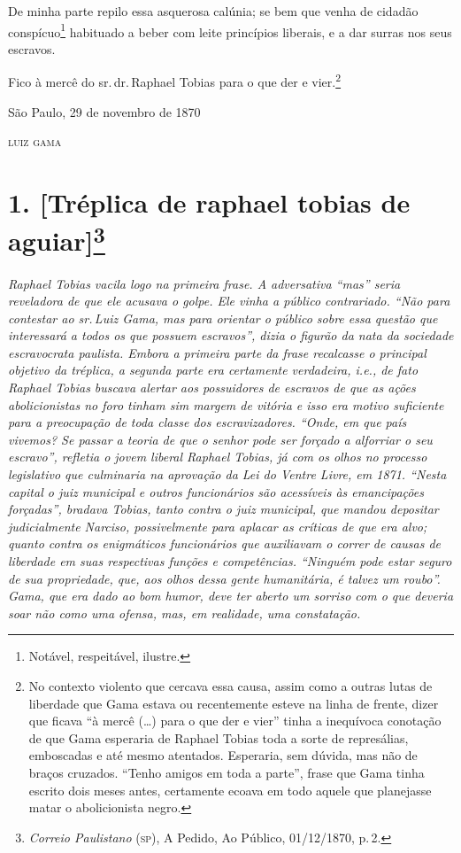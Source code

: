 De minha parte repilo essa asquerosa calúnia; se bem que venha de
cidadão conspícuo\footnote{ Notável, respeitável, ilustre.}
habituado a beber com leite princípios liberais, e a dar surras nos seus
escravos.

Fico à mercê do sr.\,dr.\,Raphael Tobias para o que der e vier.\footnote{
  No contexto violento que cercava essa causa, assim como a outras lutas
  de liberdade que Gama estava ou recentemente esteve na linha de
  frente, dizer que ficava ``à mercê (\ldots) para o que der e vier''
  tinha a inequívoca conotação de que Gama esperaria de Raphael Tobias
  toda a sorte de represálias, emboscadas e até mesmo atentados.
  Esperaria, sem dúvida, mas não de braços cruzados. ``Tenho amigos em
  toda a parte'', frase que Gama tinha escrito dois meses antes,
  certamente ecoava em todo aquele que planejasse matar o abolicionista
  negro.}

\begin{flushright}
São Paulo, 29 de novembro de 1870

\textsc{luiz gama}
\end{flushright}

\chapter{1. {[}Tréplica de raphael tobias de aguiar{]}\footnote{\emph{Correio Paulistano} (\textsc{sp}), A Pedido, Ao Público,
  01/12/1870, p.\,2.}} %

\begin{didascalia}
\emph{Raphael Tobias vacila logo na primeira frase. A adversativa ``mas''
seria reveladora de que ele acusava o golpe. Ele vinha a público
contrariado. ``Não para contestar ao sr.\,Luiz Gama, mas para orientar o
público sobre essa questão que interessará a todos os que possuem
escravos'', dizia o figurão da nata da sociedade escravocrata paulista.
Embora a primeira parte da frase recalcasse o principal objetivo da
tréplica, a segunda parte era certamente verdadeira, i.e., de fato
Raphael Tobias buscava alertar aos possuidores de escravos de que as
ações abolicionistas no foro tinham sim margem de vitória e isso era
motivo suficiente para a preocupação de toda classe dos escravizadores.
``Onde, em que país vivemos? Se passar a teoria de que o senhor pode ser
forçado a alforriar o seu escravo'', refletia o jovem liberal Raphael
Tobias, já com os olhos no processo legislativo que culminaria na
aprovação da Lei do Ventre Livre, em 1871. ``Nesta capital o juiz
municipal e outros funcionários são acessíveis às emancipações
forçadas'', bradava Tobias, tanto contra o juiz municipal, que mandou
depositar judicialmente Narciso, possivelmente para aplacar as críticas
de que era alvo; quanto contra os enigmáticos funcionários que
auxiliavam o correr de causas de liberdade em suas respectivas funções e
competências. ``Ninguém pode estar seguro de sua propriedade, que, aos
olhos dessa gente humanitária, é talvez um roubo''. Gama, que era dado ao
bom humor, deve ter aberto um sorriso com o que deveria soar não como
uma ofensa, mas, em realidade, uma constatação.}
\end{didascalia}

